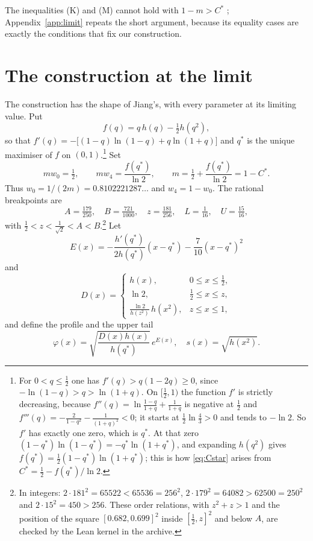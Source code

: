\documentclass[12pt]{article}
\theoremstyle{plain}
\newcommand{\qs}{q^{*}}
\newcommand{\Cs}{C^{*}}
\begin{document}
The inequalities (K) and (M) cannot hold with $1-m>\Cs$ \cite[Proposition~4.1]{Jia26}; Appendix~\ref{app:limit} repeats the short argument, because its equality cases are exactly the conditions that fix our construction.

\section{The construction at the limit}\label{sec:construction}

The construction has the shape of Jiang's, with every parameter at its limiting value. Put
\[
f(q)=q\,h(q)-\tfrac12 h(q^2),
\]
so that $f'(q)=-\bigl[(1-q)\ln(1-q)+q\ln(1+q)\bigr]$ and $\qs$ is the unique maximiser of $f$ on $(0,1)$.\footnote{For $0<q\le\frac12$ one has $f'(q)>q(1-2q)\ge 0$, since $-\ln(1-q)>q>\ln(1+q)$. On $[\frac12,1)$ the function $f'$ is strictly decreasing, because $f''(q)=\ln\frac{1-q}{1+q}+\frac1{1+q}$ is negative at $\frac12$ and $f'''(q)=-\frac{2}{1-q^2}-\frac{1}{(1+q)^2}<0$; it starts at $\frac12\ln\frac43>0$ and tends to $-\ln 2$. So $f'$ has exactly one zero, which is $\qs$. At that zero $(1-\qs)\ln(1-\qs)=-\qs\ln(1+\qs)$, and expanding $h(q^2)$ gives $f(\qs)=\frac12(1-\qs)\ln(1+\qs)$; this is how \eqref{eq:Cstar} arises from $\Cs=\frac12-f(\qs)/\ln2$.} Set
\begin{equation}\label{eq:weights}
mw_0=\tfrac12,\qquad mw_4=\frac{f(\qs)}{\ln 2},\qquad m=\tfrac12+\frac{f(\qs)}{\ln 2}=1-\Cs .
\end{equation}
Thus $w_0=1/(2m)=0.8102221287\ldots$ and $w_4=1-w_0$. The rational breakpoints are
\[
A=\tfrac{179}{250},\quad B=\tfrac{721}{1000},\quad z=\tfrac{181}{256},\quad L=\tfrac1{16},\quad U=\tfrac{15}{16},
\]
with $\frac12<z<\frac1{\sqrt2}<A<B$.\footnote{In integers: $2\cdot181^2=65522<65536=256^2$, $2\cdot179^2=64082>62500=250^2$ and $2\cdot 15^2=450>256$. These order relations, with $z^2+z>1$ and the position of the square $[0.682,0.699]^2$ inside $[\frac12,z]^2$ and below $A$, are checked by the Lean kernel in the archive.} Let
\[
E(x)=-\frac{h'(\qs)}{2h(\qs)}(x-\qs)-\frac{7}{10}(x-\qs)^2
\]
and
\[
D(x)=\begin{cases} h(x), & 0\le x\le \frac12,\\[2pt] \ln 2, & \frac12\le x\le z,\\[2pt] \frac{\ln 2}{h(z^2)}\,h(x^2), & z\le x\le 1,\end{cases}
\]
and define the profile and the upper tail
\begin{equation}\label{eq:phi}
\varphi(x)=\sqrt{\frac{D(x)h(x)}{h(\qs)}}\,e^{E(x)},\quad s(x)=\sqrt{h(x^2)} .
\end{equation}
\end{document}
